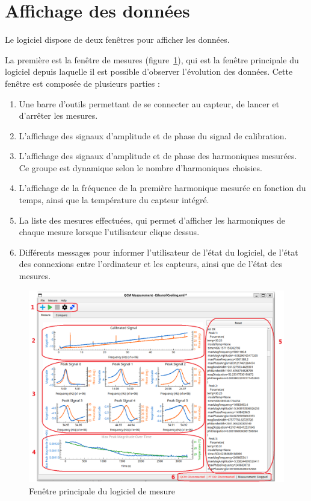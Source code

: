 \section{Affichage des données} 

Le logiciel dispose de deux fenêtres pour afficher les données.

La première est la fenêtre de mesures (figure~\ref{fig:main window}), qui est la fenêtre principale du logiciel depuis laquelle il est possible d'observer l'évolution des données.  
Cette fenêtre est composée de plusieurs parties :

\begin{enumerate}
    \item Une barre d'outils permettant de se connecter au capteur, de lancer et d'arrêter les mesures.
    \item L'affichage des signaux d'amplitude et de phase du signal de calibration.
    \item L'affichage des signaux d'amplitude et de phase des harmoniques mesurées. Ce groupe est dynamique selon le nombre d'harmoniques choisies.
    \item L'affichage de la fréquence de la première harmonique mesurée en fonction du temps, ainsi que la température du capteur intégré.
    \item La liste des mesures effectuées, qui permet d'afficher les harmoniques de chaque mesure lorsque l'utilisateur clique dessus.
    \item Différents messages pour informer l'utilisateur de l'état du logiciel, de l'état des connexions entre l'ordinateur et les capteurs, ainsi que de l'état des mesures.
\end{enumerate}

\begin{figure}[H]
    \centering
    \includegraphics[width=\textwidth]{assets/figures/Programme_.png}
    \caption{Fenêtre principale du logiciel de mesure}
    \label{fig:main window}
\end{figure}

